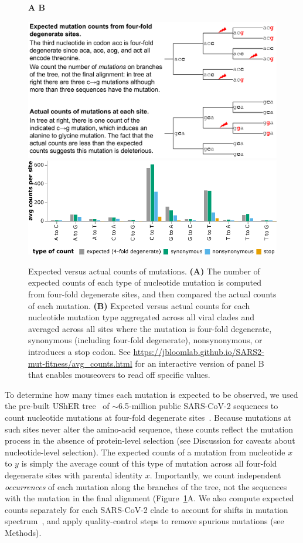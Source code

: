 \documentclass[9pt,twocolumn,twoside]{gsajnl_modified}
\begin{document}
\begin{figure}
{\bf \Large A \hspace{0.47\linewidth} B}

\includegraphics[width=0.48\linewidth,valign=t]{figs/schematic/schematic.pdf}
\hspace{0.02\linewidth}
\includegraphics[width=0.5\linewidth,valign=t]{figs/avg_counts.pdf}
\caption{
Expected versus actual counts of mutations.
{\bf (A)}
The number of expected counts of each type of nucleotide mutation is computed from four-fold degenerate sites, and then compared the actual counts of each mutation.
{\bf (B)}
Expected versus actual counts for each nucleotide mutation type aggregated across all viral clades and averaged across all sites where the mutation is four-fold degenerate, synonymous (including four-fold degenerate), nonsynonymous, or introduces a stop codon.
See \url{https://jbloomlab.github.io/SARS2-mut-fitness/avg_counts.html} for an interactive version of panel B that enables mouseovers to read off specific values.
\label{fig:expected_vs_actual}
}
\end{figure}

To determine how many times each mutation is expected to be observed, we used the pre-built UShER tree~\citep{mcbroome2021daily,turakhia2021ultrafast,lanfear2020} of $\sim$6.5-million public SARS-CoV-2 sequences to count nucleotide mutations at four-fold degenerate sites~\citep[Figure~\ref{fig:expected_vs_actual}A;][]{bloom2022evolution}.
Because mutations at such sites never alter the amino-acid sequence, these counts reflect the mutation process in the absence of protein-level selection (see Discussion for caveats about nucleotide-level selection).
The expected counts of a mutation from nucleotide $x$ to $y$ is simply the average count of this type of mutation across all four-fold degenerate sites with parental identity $x$.
Importantly, we count independent \emph{occurrences} of each mutation along the branches of the tree, not the sequences with the mutation in the final alignment (Figure~\ref{fig:expected_vs_actual}A.
We also compute expected counts separately for each SARS-CoV-2 clade to account for shifts in mutation spectrum~\citep{bloom2022evolution,ruis2022mutational}, and apply quality-control steps to remove spurious mutations (see Methods).
\end{document}
